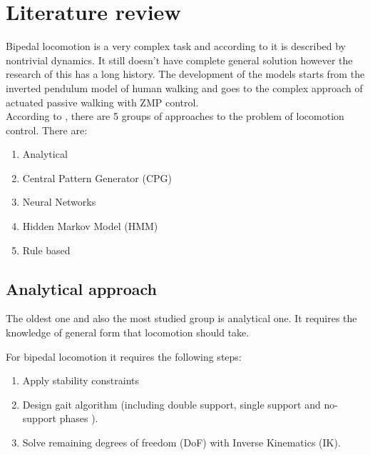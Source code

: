 \documentclass[11pt,a4paper]{report}
\begin{document}
\chapter{Literature review}
Bipedal locomotion is a very complex task and according to \cite{erbatur2002study} it is described by nontrivial dynamics. It still doesn't have complete general solution however the research of this has a long history. The development of the models starts from the inverted pendulum model of human walking and goes to the complex approach of actuated passive walking with ZMP control.\\
According to \cite{wright2014intelligent}, there are 5 groups of approaches to the problem of locomotion control. There are:
\begin{enumerate}
	\item Analytical
	\item Central Pattern Generator (CPG)
	\item Neural Networks
	\item Hidden Markov Model (HMM)
	\item Rule based
\end{enumerate}

\section{Analytical approach}
The oldest one and also the most studied group is analytical one. It requires the knowledge of general form that locomotion should take.

For bipedal locomotion it requires the following steps:
\begin{enumerate}
	\item Apply stability constraints
	\item Design gait algorithm (including double support, single support and no-support phases \cite{wright2014intelligent}).
	\item Solve remaining degrees of freedom (DoF) with Inverse Kinematics (IK).
\end{enumerate}
\end{document}
